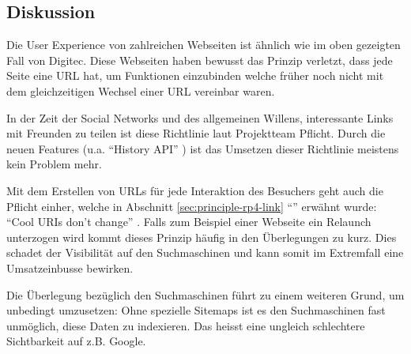 \subsection*{Diskussion}
Die User Experience von zahlreichen Webseiten ist ähnlich wie im oben gezeigten Fall von Digitec. Diese Webseiten haben bewusst das Prinzip verletzt, dass jede Seite eine \gls{URL} hat, um Funktionen einzubinden welche früher noch nicht mit dem gleichzeitigen Wechsel einer \gls{URL} vereinbar waren.

In der Zeit der Social Networks und des allgemeinen Willens, interessante Links mit Freunden zu teilen ist diese Richtlinie laut Projektteam Pflicht. Durch die neuen Features (u.a. ``History API'' \cite{HistoryAPI}) ist das Umsetzen dieser Richtlinie meistens kein Problem mehr.

Mit dem Erstellen von \glspl{URL} für jede Interaktion des Besuchers geht auch die Pflicht einher, welche in Abschnitt \ref{sec:principle-rp4-link} ``'' erwähnt wurde: ``Cool URIs don't change''  \cite{CoolURIsTBL}. Falls zum Beispiel einer Webseite ein Relaunch unterzogen wird kommt dieses Prinzip häufig in den Überlegungen zu kurz. Dies schadet der Visibilität auf den Suchmaschinen und kann somit im Extremfall eine Umsatzeinbusse bewirken.

Die Überlegung bezüglich den Suchmaschinen führt zu einem weiteren Grund, um  unbedingt umzusetzen: Ohne spezielle Sitemaps \cite{Sitemap} ist es den Suchmaschinen fast unmöglich, diese Daten zu indexieren. Das heisst eine ungleich schlechtere Sichtbarkeit auf z.B. Google.